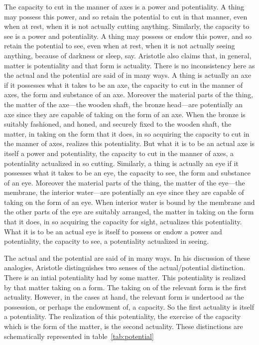 The capacity to cut in the manner of axes is a power and potentiality. A thing may possess this power, and so retain the potential to cut in that manner, even when at rest, when it is not actually cutting anything. Similarly, the capacity to see is a power and potentiality. A thing may possess or endow this power, and so retain the potential to see, even when at rest, when it is not actually seeing anything, because of darkness or sleep, say. Aristotle also claims that, in general, matter is potentiality and that form is actuality. There is no inconsistency here as the actual and the potential are said of in many ways. A thing is actually an axe if it possesses what it takes to be an axe, the capacity to cut in the manner of axes, the form and substance of an axe. Moreover the material parts of the thing, the matter of the axe---the wooden shaft, the bronze head---are potentially an axe since they are capable of taking on the form of an axe. When the bronze is suitably fashioned, and honed, and securely fixed to the wooden shaft, the matter, in taking on the form that it does, in so acquiring the capacity to cut in the manner of axes, realizes this potentiality. But what it is to be an actual axe is itself a power and potentiality, the capacity to cut in the manner of axes, a potentiality actualized in so cutting. Similarly, a thing is actually an eye if it possesses what it takes to be an eye, the capacity to see, the form and substance of an eye. Moreover the material parts of the thing, the matter of the eye---the membrane, the interior water---are potentially an eye since they are capable of taking on the form of an eye. When interior water is bound by the membrane and the other parts of the eye are suitably arranged, the matter in taking on the form that it does, in so acquiring the capacity for sight, actualizes this potentiality. What it is to be an actual eye is itself to possess or endow a power and potentiality, the capacity to see, a potentiality actualized in seeing.

The actual and the potential are said of in many ways. In his discussion of these analogies, Aristotle distinguishes two senses of the actual/potential distinction. There is an intial potentiality had by some matter. This potentiality is realized by that matter taking on a form. The taking on of the relevant form is the first actuality. However, in the cases at hand, the relevant form is undertood as the possession, or perhaps the endowment of, a capacity. So the first actuality is itself a potentiality. The realization of this potentiality, the exercise of the capacity which is the form of the matter, is the second actuality. These distinctions are schematically represented in table~\ref{tab:potential}

